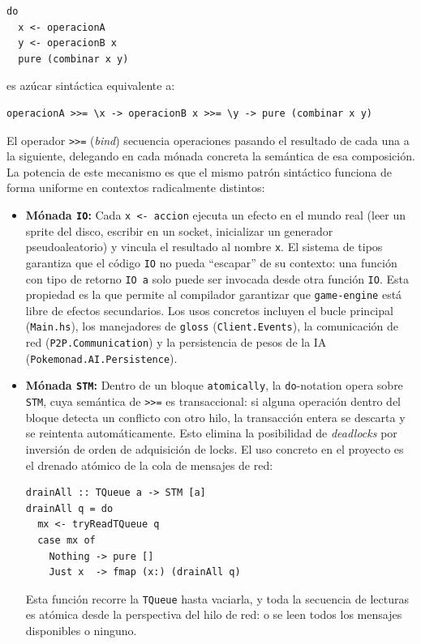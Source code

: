 \begin{verbatim}
do
  x <- operacionA
  y <- operacionB x
  pure (combinar x y)
\end{verbatim}

es azúcar sintáctica equivalente a:

\begin{verbatim}
operacionA >>= \x -> operacionB x >>= \y -> pure (combinar x y)
\end{verbatim}

El operador \verb|>>=| (\textit{bind}) secuencia operaciones pasando el resultado de cada una a la siguiente, delegando en cada mónada concreta la semántica de esa composición. La potencia de este mecanismo es que el mismo patrón sintáctico funciona de forma uniforme en contextos radicalmente distintos:

\begin{itemize}
    \item \textbf{Mónada \texttt{IO}:} Cada \texttt{x <- accion} ejecuta un efecto en el mundo real (leer un sprite del disco, escribir en un socket, inicializar un generador pseudoaleatorio) y vincula el resultado al nombre \texttt{x}. El sistema de tipos garantiza que el código \texttt{IO} no pueda ``escapar'' de su contexto: una función con tipo de retorno \texttt{IO a} solo puede ser invocada desde otra función \texttt{IO}. Esta propiedad es la que permite al compilador garantizar que \texttt{game-engine} está libre de efectos secundarios. Los usos concretos incluyen el bucle principal (\texttt{Main.hs}), los manejadores de \texttt{gloss} (\texttt{Client.Events}), la comunicación de red (\texttt{P2P.Communication}) y la persistencia de pesos de la IA (\texttt{Pokemonad.AI.Persistence}).

    \item \textbf{Mónada \texttt{STM}:} Dentro de un bloque \texttt{atomically}, la \texttt{do}-notation opera sobre \texttt{STM}, cuya semántica de \verb|>>=| es transaccional: si alguna operación dentro del bloque detecta un conflicto con otro hilo, la transacción entera se descarta y se reintenta automáticamente. Esto elimina la posibilidad de \textit{deadlocks} por inversión de orden de adquisición de locks. El uso concreto en el proyecto es el drenado atómico de la cola de mensajes de red:
    \begin{verbatim}
drainAll :: TQueue a -> STM [a]
drainAll q = do
  mx <- tryReadTQueue q
  case mx of
    Nothing -> pure []
    Just x  -> fmap (x:) (drainAll q)
    \end{verbatim}
    Esta función recorre la \texttt{TQueue} hasta vaciarla, y toda la secuencia de lecturas es atómica desde la perspectiva del hilo de red: o se leen todos los mensajes disponibles o ninguno.


\end{itemize}
